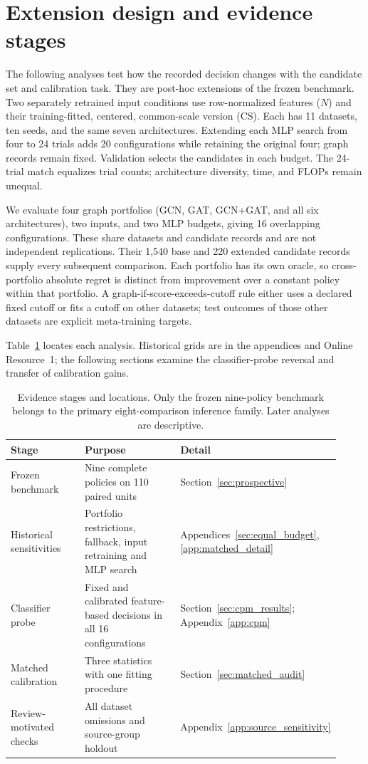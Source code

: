 \section{Extension design and evidence stages}
\label{sec:extension_design}

The following analyses test how the recorded decision changes with the candidate set and calibration task. They are post-hoc extensions of the frozen benchmark. Two separately retrained input conditions use row-normalized features ($N$) and their training-fitted, centered, common-scale version (CS). Each has 11 datasets, ten seeds, and the same seven architectures. Extending each MLP search from four to 24 trials adds 20 configurations while retaining the original four; graph records remain fixed. Validation selects the candidates in each budget. The 24-trial match equalizes trial counts; architecture diversity, time, and FLOPs remain unequal.

We evaluate four graph portfolios (GCN, GAT, GCN+GAT, and all six architectures), two inputs, and two MLP budgets, giving 16 overlapping configurations. These share datasets and candidate records and are not independent replications. Their 1,540 base and 220 extended candidate records supply every subsequent comparison. Each portfolio has its own oracle, so cross-portfolio absolute regret is distinct from improvement over a constant policy within that portfolio. A graph-if-score-exceeds-cutoff rule either uses a declared fixed cutoff or fits a cutoff on other datasets; test outcomes of those other datasets are explicit meta-training targets.

Table~\ref{tab:evidence_stages} locates each analysis. Historical grids are in the appendices and Online Resource~1; the following sections examine the classifier-probe reversal and transfer of calibration gains.

\begin{table}[tbp]
\centering
\caption{Evidence stages and locations. Only the frozen nine-policy benchmark belongs to the primary eight-comparison inference family. Later analyses are descriptive.}
\label{tab:evidence_stages}
\small
\begin{tabular}{@{}p{0.28\linewidth}p{0.39\linewidth}p{0.25\linewidth}@{}}
\toprule
Stage & Purpose & Detail \\
\midrule
Frozen benchmark & Nine complete policies on 110 paired units & Section~\ref{sec:prospective} \\
Historical sensitivities & Portfolio restrictions, fallback, input retraining and MLP search & Appendices~\ref{sec:equal_budget}, \ref{app:matched_detail} \\
Classifier probe & Fixed and calibrated feature-based decisions in all 16 configurations & Section~\ref{sec:cpm_results}; Appendix~\ref{app:cpm} \\
Matched calibration & Three statistics with one fitting procedure & Section~\ref{sec:matched_audit} \\
Review-motivated checks & All dataset omissions and source-group holdout & Appendix~\ref{app:source_sensitivity} \\
\bottomrule
\end{tabular}
\end{table}
